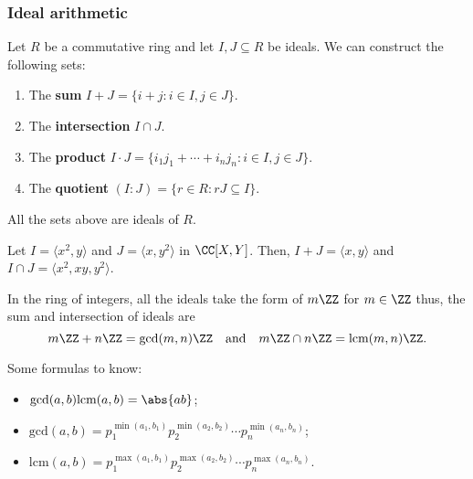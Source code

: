 \documentclass[12pt, a4paper]{article}
\begin{document}
\subsubsection{Ideal arithmetic}

\begin{definition}
    Let \(R\) be a commutative ring and let \(I,J \subseteq R\) be ideals. We can construct the following sets:
    \begin{enumerate}
        \item The \textbf{sum} \(I+J = \{i+j : i \in I, j \in J\}\).
        \item The \textbf{intersection} \(I \cap J\).
        \item The \textbf{product} \(I \cdot J = \{i_1j_1 + \cdots + i_n j_n : i \in I, j \in J\}\).
        \item The \textbf{quotient} \((I : J) = \{r \in R : rJ \subseteq I\}\).
    \end{enumerate}
\end{definition}

\begin{mdprop}
    All the sets above are ideals of \(R\).
\end{mdprop}

\begin{example}
    Let \(I = \langle x^2,y \rangle\) and \(J = \langle x,y^2 \rangle \) in \(\CC[X,Y]\). Then, \(I+J = \langle x,y \rangle\) and \(I \cap J = \langle x^2,xy,y^2 \rangle\). 
\end{example}

\begin{mdexample}
    In the ring of integers, all the ideals take the form of \(m\ZZ\) for \(m \in \ZZ\) thus, the sum and intersection of ideals are 
    \[m\ZZ+n\ZZ = \gcd(m,n)\ZZ \quad \text{and} \quad m\ZZ\cap n\ZZ = \text{lcm}(m,n)\ZZ.\]
\end{mdexample}

\begin{mdremark}
    Some formulas to know:
    \begin{itemize}
        \item \(\text{gcd}(a, b)\text{lcm}(a, b) = \abs{ab}\);
        \item \(\text{gcd}(a, b) = p_1^{\min(a_1, b_1)} p_2^{\min(a_2, b_2)} \cdots p_n^{\min(a_n, b_n)}\);
        \item \(\text{lcm}(a, b) = p_1^{\max(a_1, b_1)}  p_2^{\max(a_2, b_2)} \cdots p_n^{\max(a_n, b_n)}\).
    \end{itemize}
\end{mdremark}
\end{document}
